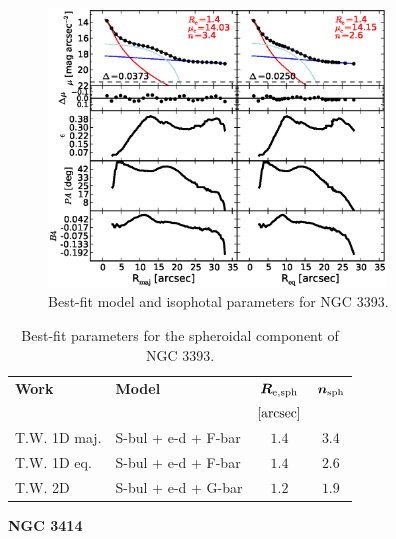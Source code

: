 \documentclass[preprint2]{emulateapj}
\newcommand{\fitfigurewidth}{0.8\textwidth}
\begin{document}
  \begin{figure}[h]
  \begin{center}
  \includegraphics[width=\fitfigurewidth]{images/n3393_1Dfit.eps}
  \caption{Best-fit model and isophotal parameters for NGC 3393.}
  \end{center}
  \end{figure}

  \begin{table}[h]
  \small
  \caption{Best-fit parameters for the spheroidal component of NGC 3393.}
  \begin{center}
  \begin{tabular}{llcc}
  \hline
  {\bf Work} & {\bf Model}   & $\bm R_{\rm e,sph}$    & $\bm n_{\rm sph}$ \\
    &  &  $[\rm arcsec]$ & \\
  \hline
  T.W. 1D maj. & S-bul + e-d + F-bar & $1.4$  &  $3.4$ \\
  T.W. 1D eq.  & S-bul + e-d + F-bar & $1.4$  &  $2.6$ \\
  T.W. 2D      & S-bul + e-d + G-bar & $1.2$  &  $1.9$ \\
  \hline
  \end{tabular}
  \end{center}
  \label{tab:n3393}
  \end{table}

  \clearpage\newpage\noindent
  {\bf NGC 3414 \\}
\end{document}
